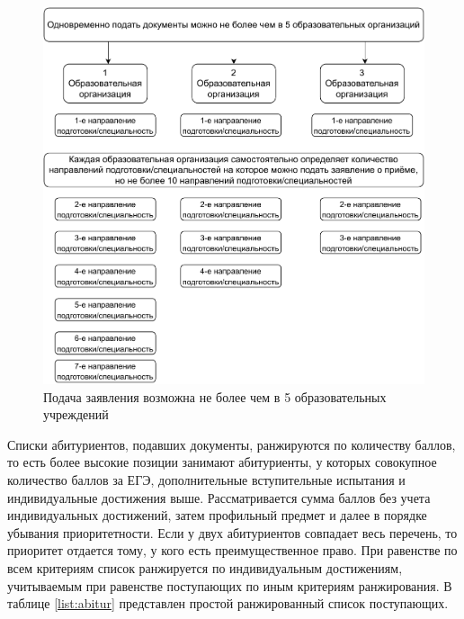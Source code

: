 \begin{figure}[hbtp]
	\centering
	\includegraphics[scale=0.8]{img/fivevuzov.drawio.pdf}
	\caption{Подача заявления возможна не более чем в 5 образовательных учреждений}
	\label{five-vuzov}
\end{figure}

Списки абитуриентов, подавших документы, ранжируются по количеству баллов, то есть более высокие позиции занимают абитуриенты, у которых совокупное количество баллов за ЕГЭ, дополнительные вступительные испытания и индивидуальные достижения выше. Рассматривается сумма баллов без учета индивидуальных достижений, затем профильный предмет и далее в порядке убывания приоритетности. Если у двух абитуриентов совпадает весь перечень, то приоритет отдается тому, у кого есть преимущественное право. При равенстве по всем критериям список ранжируется по индивидуальным достижениям, учитываемым при равенстве поступающих по иным критериям ранжирования. В таблице \ref{list:abitur} представлен простой ранжированный список поступающих.


